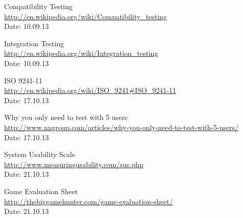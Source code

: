 \begin{thebibliography}{99}
	Compatibility Testing \\
	\href {http://en.wikipedia.org/wiki/Compatibility_testing}{http://en.wikipedia.org/wiki/Compatibility\_testing} \\
	Date: 10.09.13

	Integration Testing \\
	\href{http://en.wikipedia.org/wiki/Integration_testing}{http://en.wikipedia.org/wiki/Integration\_testing} \\
	Date: 10.09.13

	ISO 9241-11 \\
	\href {http://en.wikipedia.org/wiki/ISO_9241#ISO_9241-11}{http://en.wikipedia.org/wiki/ISO\_9241\#ISO\_9241-11} \\
	Date: 17.10.13

	Why you only need to test with 5 users \\
	\href {http://www.nngroup.com/articles/why-you-only-need-to-test-with-5-users/}{http://www.nngroup.com/articles/why-you-only-need-to-test-with-5-users/} \\
	Date: 17.10.13

	System Usability Scale \\
	\href {http://www.measuringusability.com/sus.php}{http://www.measuringusability.com/sus.php} \\
	Date: 21.10.13 

	Game Evaluation Sheet \\
	\href {http://thebiggamehunter.com/game-evaluation-sheet/}{http://thebiggamehunter.com/game-evaluation-sheet/} \\
	Date: 21.10.13
\end{thebibliography}